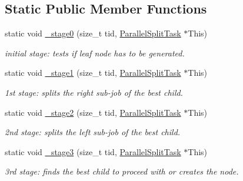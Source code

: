 \subsection*{Static Public Member Functions}
\begin{DoxyCompactItemize}
\item 
static void \hyperlink{classembree_1_1_b_v_h4_builder_1_1_parallel_split_task_ab07682dbc62196371107fff9bede7c97}{\_\-stage0} (size\_\-t tid, \hyperlink{classembree_1_1_b_v_h4_builder_1_1_parallel_split_task}{ParallelSplitTask} $\ast$This)
\begin{DoxyCompactList}\small\item\em initial stage: tests if leaf node has to be generated. \item\end{DoxyCompactList}\item 
static void \hyperlink{classembree_1_1_b_v_h4_builder_1_1_parallel_split_task_af8387b32540e7f7d72006d9280a90dee}{\_\-stage1} (size\_\-t tid, \hyperlink{classembree_1_1_b_v_h4_builder_1_1_parallel_split_task}{ParallelSplitTask} $\ast$This)
\begin{DoxyCompactList}\small\item\em 1st stage: splits the right sub-\/job of the best child. \item\end{DoxyCompactList}\item 
static void \hyperlink{classembree_1_1_b_v_h4_builder_1_1_parallel_split_task_ad90c9a0d59eb577a2f1af5728a1292ce}{\_\-stage2} (size\_\-t tid, \hyperlink{classembree_1_1_b_v_h4_builder_1_1_parallel_split_task}{ParallelSplitTask} $\ast$This)
\begin{DoxyCompactList}\small\item\em 2nd stage: splits the left sub-\/job of the best child. \item\end{DoxyCompactList}\item 
static void \hyperlink{classembree_1_1_b_v_h4_builder_1_1_parallel_split_task_af3d420d3ca386559ae4249c4ee756a8f}{\_\-stage3} (size\_\-t tid, \hyperlink{classembree_1_1_b_v_h4_builder_1_1_parallel_split_task}{ParallelSplitTask} $\ast$This)
\begin{DoxyCompactList}\small\item\em 3rd stage: finds the best child to proceed with or creates the node. \item\end{DoxyCompactList}\end{DoxyCompactItemize}


